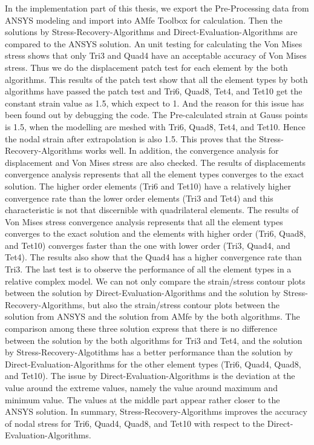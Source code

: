 In the implementation part of this thesis, we export the Pre-Processing data from ANSYS modeling and import into AMfe Toolbox for calculation. Then the solutions by Stress-Recovery-Algorithms and Direct-Evaluation-Algorithms are compared to the ANSYS solution. An unit testing for calculating the Von Mises stress shows that only Tri3 and Quad4 have an acceptable accuracy of Von Mises stress. Thus we do the displacement patch test for each element by the both algorithms. This results of the patch test show that all the element types by both algorithms have passed the patch test and Tri6, Quad8, Tet4, and Tet10 get the constant strain value as 1.5, which expect to 1. And the reason for this issue has been found out by debugging the code. The Pre-calculated strain at Gauss points is 1.5, when the modelling are meshed with Tri6, Quad8, Tet4, and Tet10. Hence the nodal strain after extrapolation is also 1.5. This proves that the Stress-Recovery-Algorithms works well. In addition, the convergence analysis for displacement and Von Mises stress are also checked. The results of displacements convergence analysis represents that all the element types converges to the exact solution. The higher order elements (Tri6 and Tet10) have a relatively higher convergence rate than the lower order elements (Tri3 and Tet4) and this characteristic is not that discernible with quadrilateral elements. The results of Von Mises stress convergence analysis represents that all the element types converges to the exact solution and the elements with higher order (Tri6, Quad8, and Tet10) converges faster than the one with lower order (Tri3, Quad4, and Tet4). The results also show that the Quad4 has a higher convergence rate than Tri3. The last test is to observe the performance of all the element types in a relative complex model. We can not only compare the strain/stress contour plots between the solution by Direct-Evaluation-Algorithms and the solution by Stress-Recovery-Algorithms, but also the strain/stress contour plots between the solution from ANSYS and the solution from AMfe by the both algorithms. The comparison among these three solution express that there is no difference between the solution by the both algorithms for Tri3 and Tet4, and the  solution by Stress-Recovery-Algotithms has a better performance than the solution by Direct-Evaluation-Algorithms for the other element types (Tri6, Quad4, Quad8, and Tet10). The issue by Direct-Evaluation-Algorithms is the deviation at the value around the extreme values, namely the value around maximum and minimum value. The values at the middle part appear rather closer to the ANSYS solution. In summary, Stress-Recovery-Algorithms improves the accuracy of nodal stress for Tri6, Quad4, Quad8, and Tet10 with respect to the Direct-Evaluation-Algorithms.  


